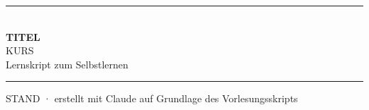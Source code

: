 \newcommand{\zuzeigen}[1]{\par{\sffamily\bfseries Zu zeigen:}\ #1\par}
\newcommand{\beweisidee}[1]{\par{\sffamily\bfseries Idee:}\ #1\par}
\newenvironment{beweis}{\par{\sffamily\bfseries Beweis.}\par\nopagebreak}{\hfill$\blacksquare$\par}
\newcommand{\schritt}[2]{\par\noindent
  \begin{minipage}[t]{0.64\linewidth}#1\end{minipage}\hfill
  \begin{minipage}[t]{0.33\linewidth}\raggedright\small\leavevmode\color{checkgrau}#2\end{minipage}\par\smallskip}


\begin{titlepage}
\vspace*{5cm}
{\color{akzent}\rule{\linewidth}{1.5pt}}\\[8pt]
{\Huge\bfseries\sffamily TITEL}\\[10pt]
{\Large KURS}\\[4pt]
{\large\color{akzent}\sffamily Lernskript zum Selbstlernen}\\[-4pt]
{\color{akzent}\rule{\linewidth}{0.8pt}}
\vfill
{\small\color{gray} STAND · erstellt mit Claude auf Grundlage des Vorlesungsskripts}
\end{titlepage}
\tableofcontents


